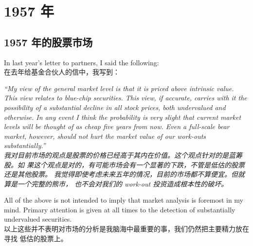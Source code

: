 \chapter{1957 年}

\section{1957 年的股票市场}

\begin{verseparallel}
  {
    \noindent In last year's letter to partners, I said the following: \\
  }
  {
    在去年给基金合伙人的信中，我写到：
  }
\end{verseparallel}

\begin{verseparallel}
  { \hspace{-0.9em}
    \textit{
    “My view of the general market level is that it is priced above intrinsic
    value. This view relates to blue-chip securities. This view, if accurate,
    carries with it the possibility of a substantial decline in all stock
    prices, both undervalued and otherwise. In any event I think the probability
    is very slight that current market levels will be thought of as cheap five
    years from now. Even a full-scale bear market, however, should not hurt the
    market value of our work-outs substantially.” \\
    }
  }
  { \hspace{-0.6em}
    \textit{
    我对目前市场的观点是股票的价格已经高于其内在价值。这个观点针对的是蓝筹股。如
    果这个观点是对的，有可能市场会有一个显著的下跌，不管是低估的股票还是其他股票。
    我觉得即使考虑未来五年的情况，目前的市场都不算便宜。但就算是一个完整的熊市，
    也不会对我们的 work-out 投资造成根本性的破坏。
    }
  }
\end{verseparallel}


\begin{verseparallel}
  {
    All of the above is not intended to imply that market analysis is foremost
    in my mind. Primary attention is given at all times to the detection of
    substantially undervalued securities. \\
  }
  {
    以上这些并不表明对市场的分析是我脑海中最重要的事，我们仍然把主要精力放在寻找
    低估的股票上。
  }
\end{verseparallel}

